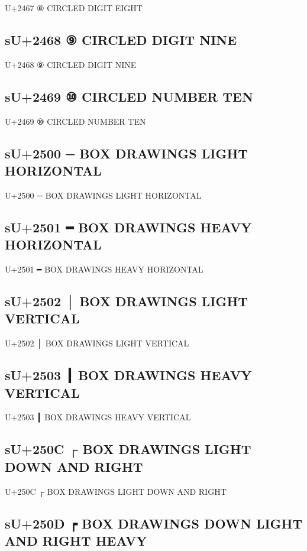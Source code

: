 U+2467 ⑧ CIRCLED DIGIT EIGHT

\subsection{sU+2468 ⑨ CIRCLED DIGIT NINE}

U+2468 ⑨ CIRCLED DIGIT NINE

\subsection{sU+2469 ⑩ CIRCLED NUMBER TEN}

U+2469 ⑩ CIRCLED NUMBER TEN

\subsection{sU+2500 ─ BOX DRAWINGS LIGHT HORIZONTAL}

U+2500 ─ BOX DRAWINGS LIGHT HORIZONTAL

\subsection{sU+2501 ━ BOX DRAWINGS HEAVY HORIZONTAL}

U+2501 ━ BOX DRAWINGS HEAVY HORIZONTAL

\subsection{sU+2502 │ BOX DRAWINGS LIGHT VERTICAL}

U+2502 │ BOX DRAWINGS LIGHT VERTICAL

\subsection{sU+2503 ┃ BOX DRAWINGS HEAVY VERTICAL}

U+2503 ┃ BOX DRAWINGS HEAVY VERTICAL

\subsection{sU+250C ┌ BOX DRAWINGS LIGHT DOWN AND RIGHT}

U+250C ┌ BOX DRAWINGS LIGHT DOWN AND RIGHT

\subsection{sU+250D ┍ BOX DRAWINGS DOWN LIGHT AND RIGHT HEAVY}

